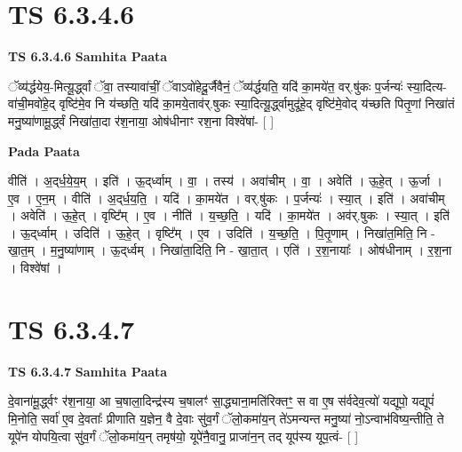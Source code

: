 \documentclass[17pt]{extarticle}
\begin{document}

\section{ TS 6.3.4.6 }

\textbf{TS 6.3.4.6 } \newline
\textbf{Samhita Paata} \newline

ॅव्य॑र्द्धयेय॒-मित्यू॒र्द्ध्वां ॅवा॒ तस्यावा॑चीं॒ ॅवाऽवो॑हेदू॒र्जैवैनं॒ ॅव्य॑र्द्धयति॒ यदि॑ का॒मये॑त॒ वर्.षु॑कः प॒र्जन्यः॑ स्या॒दित्य-वा॑ची॒मवो॑हे॒द् वृष्टि॑मे॒व नि य॑च्छति॒ यदि॑ का॒मये॒ताव॑र्.षुकः स्या॒दित्यू॒र्द्ध्वामुदू॑हे॒द् वृष्टि॑मे॒वोद् य॑च्छति पितृ॒णां निखा॑तं मनु॒ष्या॑णामू॒र्द्ध्वं निखा॑ता॒दा र॑श॒नाया॒ ओष॑धीनाꣳ रश॒ना विश्वे॑षां- [  ] \newline

\textbf{Pada Paata} \newline

वीति॑ । अ॒द्‌र्ध॒ये॒य॒म् । इति॑ । ऊ॒द्‌र्ध्वाम् । वा॒ । तस्य॑ । अवा॑चीम् । वा॒ । अवेति॑ । ऊ॒हे॒त् । ऊ॒र्जा । ए॒व । ए॒न॒म् । वीति॑ । अ॒द्‌र्ध॒य॒ति॒ । यदि॑ । का॒मये॑त । वर्.षु॑कः । प॒र्जन्यः॑ । स्या॒त् । इति॑ । अवा॑चीम् । अवेति॑ । ऊ॒हे॒त् । वृष्टि᳚म् । ए॒व । नीति॑ । य॒च्छ॒ति॒ । यदि॑ । का॒मये॑त । अव॑र्.षुकः । स्या॒त् । इति॑ । ऊ॒द्‌र्ध्वाम् । उदिति॑ । ऊ॒हे॒त् । वृष्टि᳚म् । ए॒व । उदिति॑ । य॒च्छ॒ति॒ । पि॒तृ॒णाम् । निखा॑त॒मिति॒ नि - खा॒त॒म् । म॒नु॒ष्या॑णाम् । ऊ॒द्‌र्ध्वम् । निखा॑ता॒दिति॒ नि - खा॒ता॒त् । एति॑ । र॒श॒नायाः᳚ । ओष॑धीनाम् । र॒श॒ना । विश्वे॑षां ।  \newline





\section{ TS 6.3.4.7 }

\textbf{TS 6.3.4.7 } \newline
\textbf{Samhita Paata} \newline

दे॒वाना॑मू॒र्द्ध्वꣳ र॑श॒नाया॒ आ च॒षाला॒दिन्द्र॑स्य च॒षालꣳ॑ सा॒द्ध्याना॒मति॑रिक्तꣳ॒॒ स वा ए॒ष स॑र्वदेव॒त्यो॑ यद्यूपो॒ यद्यूपं॑ मि॒नोति॒ सर्वा॑ ए॒व दे॒वताः᳚ प्रीणाति य॒ज्ञेन॒ वै दे॒वाः सु॑व॒र्गं ॅलो॒कमा॑य॒न् ते॑ऽमन्यन्त मनु॒ष्या॑ नो॒ऽन्वाभ॑विष्य॒न्तीति॒ ते यूपे॑न योपयि॒त्वा सु॑व॒र्गं ॅलो॒कमा॑य॒न् तमृष॑यो॒ यूपे॑नै॒वानु॒ प्राजा॑न॒न् तद् यूप॑स्य यूप॒त्वं- [  ] \newline
\end{document}
